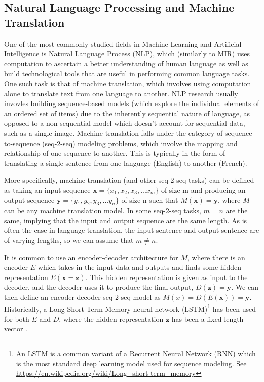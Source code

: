 \subsection{Natural Language Processing and Machine Translation}
One of the most commonly studied fields in Machine Learning and Artificial Intelligence is Natural Language Process (NLP), which (similarly to MIR) uses computation to ascertain a better understanding of human language as well as build technological tools that are useful in performing common language tasks. One such task is that of machine translation, which involves using computation alone to translate text from one language to another. NLP research usually invovles building sequence-based models (which explore the individual elements of an ordered set of items) due to the inherently sequential nature of language, as opposed to a non-sequential model which doesn't account for sequential data, such as a single image. Machine translation falls under the category of sequence-to-sequence (seq-2-seq) modeling problems, which involve the mapping and relationship of one sequence to another. This is typically in the form of translating a single sentence from one language (English) to another (French).

\newcommand{\mb}[1]{\mathbf{#1}}

More specifically, machine translation (and other seq-2-seq tasks) can be defined as taking an input sequence $\mb{x} = \{x_1, x_2, x_3,...x_m\}$ of size m and producing an output sequence $\mb{y} = \{y_1, y_2, y_3, ... y_n\}$ of size n such that $M(\mb{x}) = \mb{y}$, where $M$ can be any machine translation model. In some seq-2-seq tasks, $m = n$ are the same, implying that the input and output sequence are the same length. As is often the case in language translation, the input sentence and output sentence are of varying lengths, so we can assume that $m \neq n$. 

It is common to use an encoder-decoder architecture for $M$, where there is an encoder $E$ which takes in the input data and outputs and finds some hidden representation $E(\mb{x} = \mb{z})$. This hidden representation is given as input to the decoder, and the decoder uses it to produce the final output, $D(\mb{z}) = \mb{y}$. We can then define an encoder-decoder seq-2-seq model as $M(x) = D(E(\mb{x})) = \mb{y}$. Historically, a Long-Short-Term-Memory neural network (LSTM)\footnote{An LSTM is a common variant of a Recurrent Neural Network (RNN) which is the most standard deep learning model used for sequence modeling. See \url{https://en.wikipedia.org/wiki/Long_short-term_memory}} has been used for both $E$ and $D$, where the hidden representation $\mb{z}$ has been a fixed length vector . 

